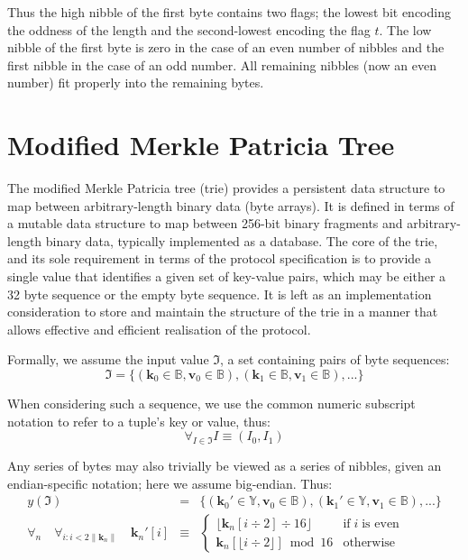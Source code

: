 \documentclass[9pt,oneside]{amsart}
\begin{document}
Thus the high nibble of the first byte contains two flags; the lowest bit encoding the oddness of the length and the second-lowest encoding the flag $t$. The low nibble of the first byte is zero in the case of an even number of nibbles and the first nibble in the case of an odd number. All remaining nibbles (now an even number) fit properly into the remaining bytes.

\section{Modified Merkle Patricia Tree}\label{app:trie}
The modified Merkle Patricia tree (trie) provides a persistent data structure to map between arbitrary-length binary data (byte arrays). It is defined in terms of a mutable data structure to map between 256-bit binary fragments and arbitrary-length binary data, typically implemented as a database. The core of the trie, and its sole requirement in terms of the protocol specification is to provide a single value that identifies a given set of key-value pairs, which may be either a 32 byte sequence or the empty byte sequence. It is left as an implementation consideration to store and maintain the structure of the trie in a manner that allows effective and efficient realisation of the protocol.

Formally, we assume the input value $\mathfrak{I}$, a set containing pairs of byte sequences:
\begin{equation}
\mathfrak{I} = \{ (\mathbf{k}_0 \in \mathbb{B}, \mathbf{v}_0 \in \mathbb{B}), (\mathbf{k}_1 \in \mathbb{B}, \mathbf{v}_1 \in \mathbb{B}), ... \}
\end{equation}

When considering such a sequence, we use the common numeric subscript notation to refer to a tuple's key or value, thus:
\begin{equation}
\forall_{I \in \mathfrak{I}} I \equiv (I_0, I_1)
\end{equation}

Any series of bytes may also trivially be viewed as a series of nibbles, given an endian-specific notation; here we assume big-endian. Thus:
\begin{eqnarray}
y(\mathfrak{I}) & = & \{ (\mathbf{k}_0' \in \mathbb{Y}, \mathbf{v}_0 \in \mathbb{B}), (\mathbf{k}_1' \in \mathbb{Y}, \mathbf{v}_1 \in \mathbb{B}), ... \} \\
\forall_n \quad \forall_{i: i < 2\lVert\mathbf{k}_n\rVert} \quad \mathbf{k}_n'[i] & \equiv &
\begin{cases}
\lfloor \mathbf{k}_n[i \div 2] \div 16 \rfloor & \text{if} \; i \; \text{is even} \\
\mathbf{k}_n[\lfloor i \div 2 \rfloor] \bmod 16 & \text{otherwise}
\end{cases}
\end{eqnarray}
\end{document}
